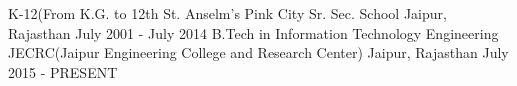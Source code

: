 \begin{cventries}
\cventry
    {K-12(From K.G. to 12th}
    {St. Anselm's Pink City Sr. Sec. School }
    {Jaipur, Rajasthan}
    {July 2001 - July 2014}
    {
    }
  \cventry
    {B.Tech in Information Technology Engineering}
    {JECRC(Jaipur Engineering College and Research Center)}
    {Jaipur, Rajasthan}
    {July 2015 - PRESENT}
    {
    }
\end{cventries}
